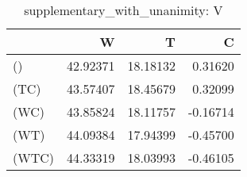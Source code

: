 \begin{table}
\centering
\caption{supplementary_with_unanimity: V}
\begin{tabular}{lrrr}
\toprule
{} &        W &        T &        C \\
\midrule
()    & 42.92371 & 18.18132 &  0.31620 \\
(TC)  & 43.57407 & 18.45679 &  0.32099 \\
(WC)  & 43.85824 & 18.11757 & -0.16714 \\
(WT)  & 44.09384 & 17.94399 & -0.45700 \\
(WTC) & 44.33319 & 18.03993 & -0.46105 \\
\bottomrule
\end{tabular}
\end{table}
